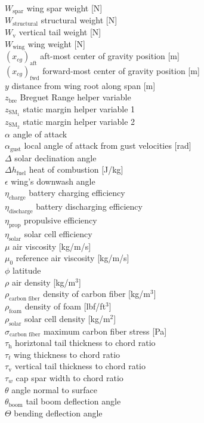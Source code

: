 \documentclass[]{aiaa-tc}%
\begin{document}
\begin{multicols}{2}
\begin{tabbing}
$W_{\text{spar}}$ \> wing spar weight [N] \\
$W_{\text{structural}}$ \> structural weight [N] \\
$W_{\text{v}}$ \> vertical tail weight [N] \\
$W_{\text{wing}}$ \> wing weight [N] \\
$(x_{cg})_{\text{aft}}$ \> aft-most center of gravity position [m] \\
$(x_{cg})_{\text{fwd}}$ \> forward-most center of gravity position [m] \\
$y$ \> distance from wing root along span [m] \\
$z_{\text{bre}}$ \> Breguet Range helper variable \\
$z_{\text{SM}_1}$ \> static margin helper variable 1 \\
$z_{\text{SM}_2}$ \> static margin helper variable 2 \\
$\alpha$ \> angle of attack \\
$\alpha_{\text{gust}}$ \> local angle of attack from gust velocities [rad] \\
$\Delta$ \> solar declination angle \\
$\Delta h_{\text{fuel}}$ \> heat of combustion [J/kg] \\
$\epsilon$ \> wing's downwash angle \\
$\eta_{\text{charge}}$ \> battery charging efficiency \\
$\eta_{\text{discharge}}$ \> battery discharging efficiency \\
$\eta_{\text{prop}}$ \> propulsive efficiency \\
$\eta_{\text{solar}}$ \> solar cell efficiency \\
$\mu$ \> air viscosity [kg/m/s] \\
$\mu_0$ \> reference air viscosity [kg/m/s] \\
$\phi$ \> latitude \\
$\rho$ \> air density [kg/m$^3$] \\
$\rho_{\text{carbon fiber}}$ \> density of carbon fiber [kg/m$^3$] \\
$\rho_{\text{foam}}$ \> density of foam [lbf/ft$^3$] \\
$\rho_{\text{solar}}$ \> solar cell density [kg/m$^2$] \\
$\sigma_{\text{carbon fiber}}$ \> maximum carbon fiber stress [Pa] \\
$\tau_{\text{h}}$ \> horiztonal tail thickness to chord ratio \\
$\tau_t$ \> wing thickness to chord ratio \\
$\tau_{\text{v}}$ \> vertical tail thickness to chord ratio \\
$\tau_w$ \> cap spar width to chord ratio \\
$\theta$ \> angle normal to surface \\
$\theta_{\text{boom}}$ \> tail boom deflection angle \\
$\Theta$ \> bending deflection angle 
 \end{tabbing}

\end{multicols}
\end{document}
